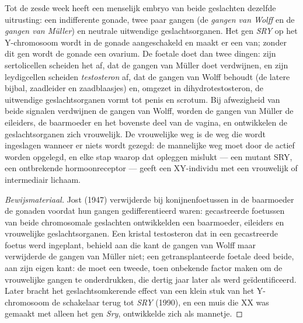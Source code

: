 \begin{proposition}\label{prop:b2:mammal-reproduction:sex}
Tot de zesde week heeft een menselijk embryo van beide geslachten dezelfde
uitrusting: een indifferente gonade, twee paar gangen (de \emph{gangen van
Wolff} en de \emph{gangen van Müller}) en neutrale uitwendige
geslachtsorganen. Het gen \emph{SRY} op het Y-chromosoom wordt in de gonade
aangeschakeld en maakt er een  van; zonder dit gen wordt de gonade een
ovarium. De foetale  doet dan twee dingen: zijn sertolicellen
scheiden het \emph{} af, dat de gangen van Müller doet
verdwijnen, en zijn leydigcellen scheiden \emph{testosteron} af, dat de
gangen van Wolff behoudt (de latere bijbal, zaadleider en zaadblaasjes) en,
omgezet in dihydrotestosteron, de uitwendige geslachtsorganen vormt tot
penis en scrotum. Bij afwezigheid van beide signalen verdwijnen de gangen
van Wolff, worden de gangen van Müller de eileiders, de baarmoeder en het
bovenste deel van de vagina, en ontwikkelen de geslachtsorganen zich
vrouwelijk. De vrouwelijke weg is de weg die wordt ingeslagen wanneer er
niets wordt gezegd: de mannelijke weg moet door de  actief worden
opgelegd, en elke stap waarop dat opleggen mislukt --- een mutant SRY, een
ontbrekende hormoonreceptor --- geeft een XY-individu met een vrouwelijk
of intermediair lichaam.
\end{proposition}
\begin{proof}[Bewijsmateriaal]
Jost (1947) verwijderde bij konijnenfoetussen in de baarmoeder de gonaden
voordat hun gangen gedifferentieerd waren: gecastreerde foetussen van
beide chromosomale geslachten ontwikkelden een baarmoeder, eileiders en
vrouwelijke geslachtsorganen. Een kristal testosteron dat in een
gecastreerde foetus werd ingeplant, behield aan die kant de gangen van
Wolff maar verwijderde de gangen van Müller niet; een getransplanteerde
foetale  deed beide, aan zijn eigen kant: de  moet een tweede,
toen onbekende factor maken om de vrouwelijke gangen te onderdrukken, die
dertig jaar later als  werd geïdentificeerd. Later bracht
het geslachtsomkerende effect van een klein stuk van het Y-chromosoom de
schakelaar terug tot \emph{SRY} (1990), en een muis die XX was gemaakt met
alleen het gen \emph{Sry}, ontwikkelde zich als mannetje.
\end{proof}

